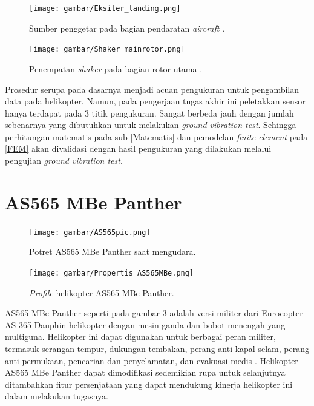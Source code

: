 \begin{figure}[H]
	\centering
	\texttt{[image: gambar/Eksiter\_landing.png]}
	\caption{Sumber penggetar pada bagian pendaratan \textit{aircraft} \cite{lubrina:hal-01059708}.}
	\label{fig:shaker_landing}
\end{figure}

\begin{figure}[H]
	\centering
	\texttt{[image: gambar/Shaker\_mainrotor.png]}
	\caption{Penempatan \textit{shaker} pada bagian rotor utama \cite{Ciavarella2018AnEH}.}
	\label{fig:shaker_rotor}
\end{figure}


Prosedur serupa pada dasarnya menjadi acuan pengukuran untuk pengambilan data pada helikopter. Namun, pada pengerjaan tugas akhir ini peletakkan sensor hanya terdapat pada 3 titik pengukuran. Sangat berbeda jauh dengan jumlah sebenarnya yang dibutuhkan untuk melakukan \textit{ground vibration test}. Sehingga perhitungan matematis pada sub \ref{Matematis} dan pemodelan \textit{finite element} pada \ref{FEM} akan divalidasi dengan hasil pengukuran yang dilakukan melalui pengujian \textit{ground vibration test}.

\section{AS565 MBe Panther}
\label{sec:AS565MBe}

\begin{figure}[H]
	\centering
	\texttt{[image: gambar/AS565pic.png]}
	\caption{Potret AS565 MBe Panther saat mengudara.}
	\label{fig:AS565pic}
\end{figure}

\begin{figure}[H]
	\centering
	\texttt{[image: gambar/Propertis\_AS565MBe.png]}
	\caption{\textit{Profile} helikopter AS565 MBe Panther.}
	\label{fig:AS565MBe}
\end{figure}

AS565 MBe Panther seperti pada gambar \ref{fig:AS565pic} adalah versi militer dari Eurocopter AS 365 Dauphin helikopter dengan mesin ganda dan bobot menengah yang multiguna. Helikopter ini dapat digunakan untuk berbagai peran militer, termasuk serangan tempur, dukungan tembakan, perang anti-kapal selam, perang anti-permukaan, pencarian dan penyelamatan, dan evakuasi medis \cite{AS565MBe}. Helikopter AS565 MBe Panther dapat dimodifikasi sedemikian rupa untuk selanjutnya ditambahkan fitur persenjataan yang dapat mendukung kinerja helikopter ini dalam melakukan tugasnya.

